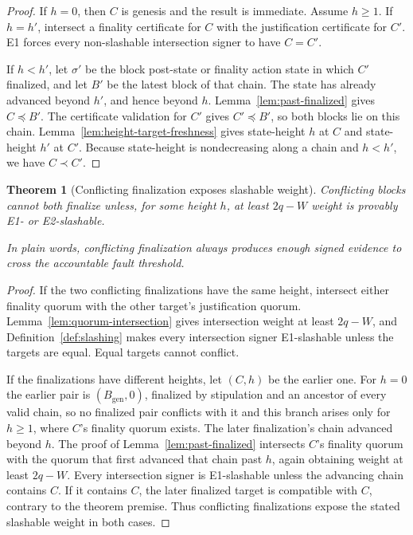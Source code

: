\ifx\litemode\undefined\documentclass{article}\fi
\theoremstyle{plain}
\newtheorem{theorem}{Theorem}
\theoremstyle{definition}
\theoremstyle{remark}
\newcommand{\genesis}{B_{\mathrm{gen}}}
\begin{document}
\begin{proof}
If \(h=0\), then \(C\) is genesis and the result is immediate.  Assume
\(h\geq1\).
If \(h=h'\), intersect a finality certificate for \(C\) with the justification
certificate for \(C'\).  E1 forces every non-slashable intersection signer to
have \(C=C'\).

If \(h<h'\), let \(\sigma'\) be the block post-state or finality action state
in which \(C'\) finalized, and let \(B'\) be the latest block of that chain.
The state has already advanced beyond \(h'\), and hence beyond \(h\).
Lemma~\ref{lem:past-finalized} gives \(C\preceq B'\).  The certificate
validation for \(C'\) gives \(C'\preceq B'\), so both blocks lie on this
chain.
Lemma~\ref{lem:height-target-freshness} gives state-height \(h\) at \(C\)
and state-height \(h'\) at \(C'\).  Because state-height is nondecreasing along a
chain and \(h<h'\), we have \(C\prec C'\).
\end{proof}

\begin{theorem}[Conflicting finalization exposes slashable weight]\label{thm:accountable-safety}
Conflicting blocks cannot both finalize unless, for some height \(h\), at least
\(2q-W\) weight is provably E1- or E2-slashable.

In plain words, conflicting finalization always produces enough signed
evidence to cross the accountable fault threshold.
\end{theorem}

\begin{proof}
If the two conflicting finalizations have the same height, intersect either
finality quorum with the other target's justification quorum.
Lemma~\ref{lem:quorum-intersection} gives intersection weight at least
\(2q-W\), and Definition~\ref{def:slashing} makes every intersection signer
E1-slashable unless the targets are equal.  Equal targets cannot conflict.

If the finalizations have different heights, let \((C,h)\) be the earlier
one.  For \(h=0\) the earlier pair is \((\genesis,0)\), finalized by
stipulation and an ancestor of every valid chain, so no finalized pair
conflicts with it and this branch arises only for \(h\geq1\), where
\(C\)'s finality quorum exists.  The later finalization's chain advanced beyond \(h\).  The proof of
Lemma~\ref{lem:past-finalized} intersects \(C\)'s finality quorum with the
quorum that first advanced that chain past \(h\), again obtaining weight at
least \(2q-W\).  Every intersection signer is E1-slashable unless the
advancing chain contains \(C\).  If it contains \(C\), the later finalized
target is compatible with \(C\), contrary to the theorem premise.  Thus
conflicting finalizations expose the stated slashable weight in both cases.
\end{proof}
\end{document}
